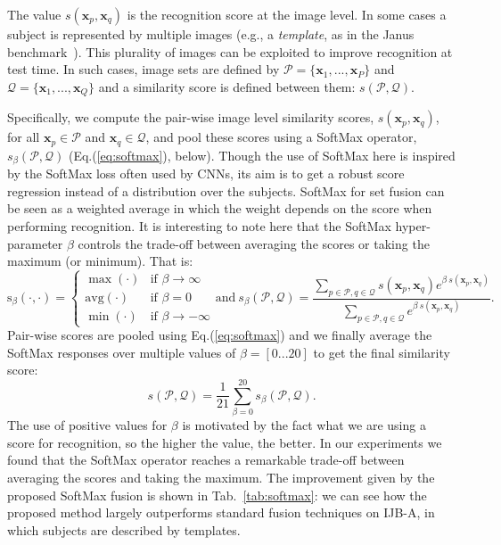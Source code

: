 \documentclass[runningheads]{llncs}
\def\mbf#1{\mathbf{#1}}
\def\mit#1{\mathit{#1}}
\begin{document}
The value $s(\mbf{x}_p, \mbf{x}_q)$ is the recognition score at the image level. In some cases a subject is represented by multiple images (e.g., a {\em template}, as in the Janus benchmark~\cite{klare2015pushing}). This plurality of images can be exploited to improve recognition at test time. In such cases, image sets are defined by $\mathcal{P}=\{\mbf{x}_1,...,\mbf{x}_P \}$ and $\mathcal{Q}=\{\mbf{x}_1,...,\mbf{x}_Q \}$ and a similarity score is defined between them: $s(\mathcal{P},\mathcal{Q})$.



Specifically, we compute the pair-wise image level similarity scores, $s(\mbf{x}_p, \mbf{x}_q)$, for all $\mbf{x}_p\in \mathcal{P}$ and $\mbf{x}_q\in\mathcal{Q}$, and pool these scores using a SoftMax operator, $s_{\beta}(\mathcal{P},\mathcal{Q})$ (Eq.(\ref{eq:softmax}), below). Though the use of SoftMax here is inspired by the SoftMax loss often used by CNNs, its aim is to get a robust score regression instead of a distribution over the subjects. SoftMax for set fusion can be seen as a weighted average in which the weight depends on the score when performing recognition. It is interesting to note here that the SoftMax hyper-parameter $\beta$ controls the trade-off between averaging the scores or taking the maximum (or minimum). That is:
\begin{equation}
\mbox{s}_{\beta}(\cdot,\cdot)   = \begin{cases} \max(\cdot) &  \mbox{if } \beta \to  \infty \\ 
\mbox{avg}(\cdot) & \mbox{if } \beta=0\\
\min(\cdot) & \mbox{if } \beta \to  -\infty \end{cases}
\text{and}~ 
s_{\beta}(\mathcal{P}, \mathcal{Q}) = \frac{\sum_{p \in \mathcal{P}, q \in \mathcal{Q}} s(\mbf{x}_p, \mbf{x}_q)\mit{e}^{\beta ~ s(\mbf{x}_p, \mbf{x}_q)} }{\sum_{p \in \mathcal{P}, q \in \mathcal{Q}} \mit{e}^{\beta ~ s(\mbf{x}_p, \mbf{x}_q)}}.
\label{eq:softmax}
\end{equation}
Pair-wise scores are pooled using Eq.(\ref{eq:softmax}) and we finally average the SoftMax responses over multiple values of $\beta= \left [ 0 ... 20 \right ]$ to get the final similarity score:
\begin{equation}
s(\mathcal{P}, \mathcal{Q}) = \frac{1}{21}\sum_{\beta=0}^{20} s_{\beta}(\mathcal{P}, \mathcal{Q}).
\end{equation}
The use of positive values for $\beta$ is motivated by the fact what we are using a score for recognition, so the higher the value, the better. In our experiments we found that the SoftMax operator reaches a remarkable trade-off between averaging the scores and taking the maximum. The improvement given by the proposed SoftMax fusion is shown in Tab.~\ref{tab:softmax}: we can see how the proposed method largely outperforms standard fusion techniques on IJB-A, in which subjects are described by templates.
\end{document}

